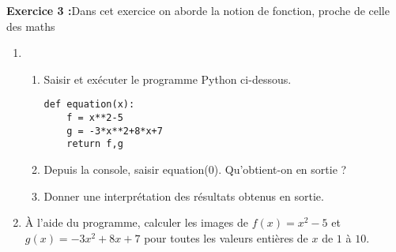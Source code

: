 \textbf{Exercice 3 :}{Dans cet exercice on aborde la notion de fonction, proche de celle des maths}

\begin{enumerate}
\item \begin{enumerate}
      \item Saisir et exécuter le programme Python ci-dessous.
            
            \medskip

\begin{center}
\begin{minipage}{6cm}
\begin{lstlisting}
def equation(x):
	f = x**2-5
	g = -3*x**2+8*x+7
	return f,g
\end{lstlisting}
\end{minipage}
\end{center}

      \item Depuis la console, saisir {equation(0)}. Qu'obtient-on en sortie ?
      \item Donner une interprétation des résultats obtenus en sortie. 
      \end{enumerate}
\item À l'aide du programme, calculer les images de $f(x) = x^2-5$ et $ g(x) = -3x^2+8x+7 $ pour toutes les valeurs entières de $ x $ de $ 1 $ à $ 10 $.
\end{enumerate}


